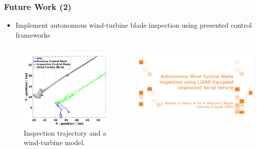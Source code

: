 \begin{frame}
	\frametitle{Future Work (2)}
	\begin{itemize}
		\item Implement autonomous wind-turbine blade inspection using presented control frameworks
	\end{itemize}
	\begin{columns}
		\begin{column}{0.5\textwidth}\centering
			\begin{figure}[H]
				\centering
				\includegraphics[width=0.8\columnwidth]{figures/uav_position_experiment_resized.pdf}
				\caption{Inspection trajectory and a wind-turbine model.}
			\end{figure}
		\end{column}
		\begin{column}{0.5\textwidth}\centering
			\href{video_presentation.mp4}{\includegraphics[width=\columnwidth]{figures/title_screen.png}}
		\end{column}
	\end{columns}
\end{frame}
